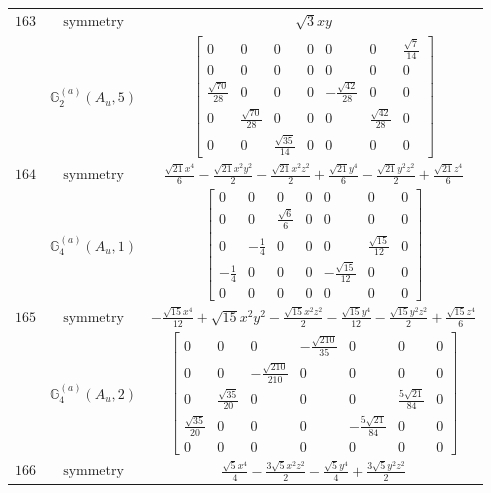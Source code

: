 \documentclass[fleqn,8pt,landscape]{jsarticle}
\begin{document}
\begin{longtable}{ccc}
$ 163 $ & $ \text{symmetry} $ & $ \sqrt{3} x y $ \\
$  $ & $ \mathbb{G}_{2}^{(a)}(A_{u},5) $ & $ \begin{bmatrix} 0 & 0 & 0 & 0 & 0 & 0 & \frac{\sqrt{7}}{14} \\ 0 & 0 & 0 & 0 & 0 & 0 & 0 \\ \frac{\sqrt{70}}{28} & 0 & 0 & 0 & - \frac{\sqrt{42}}{28} & 0 & 0 \\ 0 & \frac{\sqrt{70}}{28} & 0 & 0 & 0 & \frac{\sqrt{42}}{28} & 0 \\ 0 & 0 & \frac{\sqrt{35}}{14} & 0 & 0 & 0 & 0 \end{bmatrix} $ \\ \hline
$ 164 $ & $ \text{symmetry} $ & $ \frac{\sqrt{21} x^{4}}{6} - \frac{\sqrt{21} x^{2} y^{2}}{2} - \frac{\sqrt{21} x^{2} z^{2}}{2} + \frac{\sqrt{21} y^{4}}{6} - \frac{\sqrt{21} y^{2} z^{2}}{2} + \frac{\sqrt{21} z^{4}}{6} $ \\
$  $ & $ \mathbb{G}_{4}^{(a)}(A_{u},1) $ & $ \begin{bmatrix} 0 & 0 & 0 & 0 & 0 & 0 & 0 \\ 0 & 0 & \frac{\sqrt{6}}{6} & 0 & 0 & 0 & 0 \\ 0 & - \frac{1}{4} & 0 & 0 & 0 & \frac{\sqrt{15}}{12} & 0 \\ - \frac{1}{4} & 0 & 0 & 0 & - \frac{\sqrt{15}}{12} & 0 & 0 \\ 0 & 0 & 0 & 0 & 0 & 0 & 0 \end{bmatrix} $ \\ \hline
$ 165 $ & $ \text{symmetry} $ & $ - \frac{\sqrt{15} x^{4}}{12} + \sqrt{15} x^{2} y^{2} - \frac{\sqrt{15} x^{2} z^{2}}{2} - \frac{\sqrt{15} y^{4}}{12} - \frac{\sqrt{15} y^{2} z^{2}}{2} + \frac{\sqrt{15} z^{4}}{6} $ \\
$  $ & $ \mathbb{G}_{4}^{(a)}(A_{u},2) $ & $ \begin{bmatrix} 0 & 0 & 0 & - \frac{\sqrt{210}}{35} & 0 & 0 & 0 \\ 0 & 0 & - \frac{\sqrt{210}}{210} & 0 & 0 & 0 & 0 \\ 0 & \frac{\sqrt{35}}{20} & 0 & 0 & 0 & \frac{5 \sqrt{21}}{84} & 0 \\ \frac{\sqrt{35}}{20} & 0 & 0 & 0 & - \frac{5 \sqrt{21}}{84} & 0 & 0 \\ 0 & 0 & 0 & 0 & 0 & 0 & 0 \end{bmatrix} $ \\ \hline
$ 166 $ & $ \text{symmetry} $ & $ \frac{\sqrt{5} x^{4}}{4} - \frac{3 \sqrt{5} x^{2} z^{2}}{2} - \frac{\sqrt{5} y^{4}}{4} + \frac{3 \sqrt{5} y^{2} z^{2}}{2} $ \\

\end{longtable}
\end{document}
